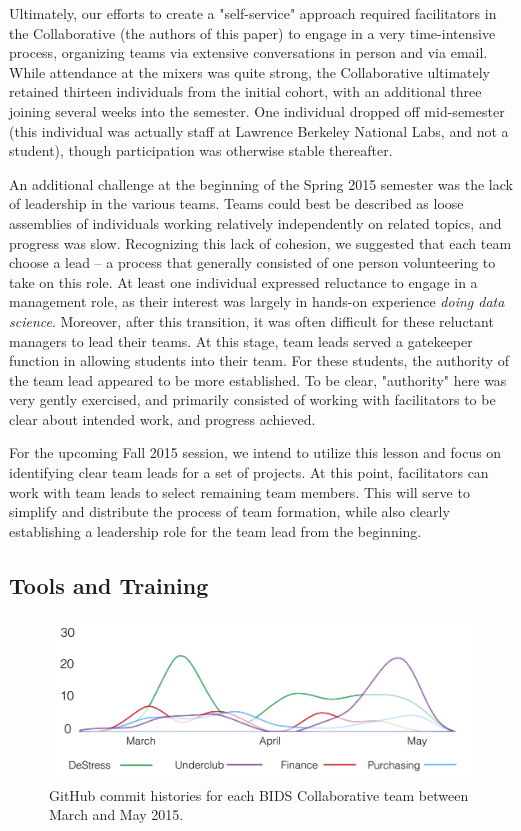 \documentclass{sig-alternate}
\begin{document}
Ultimately, our efforts to create a "self-service" approach required facilitators in the Collaborative (the authors of this paper) to engage in a very time-intensive process, organizing teams via extensive conversations in person and via email. While attendance at the mixers was quite strong, the Collaborative ultimately retained thirteen individuals from the initial cohort, with an additional three joining several weeks into the semester. One individual dropped off mid-semester (this individual was actually staff at Lawrence Berkeley National Labs, and not a student), though participation was otherwise stable thereafter.

An additional challenge at the beginning of the Spring 2015 semester was the lack of leadership in the various teams. Teams could best be described as loose assemblies of individuals working relatively independently on related topics, and progress was slow. Recognizing this lack of cohesion, we suggested that each team choose a lead -- a process that generally consisted of one person volunteering to take on this role. At least one individual expressed reluctance to engage in a management role, as their interest was largely in hands-on experience \emph{doing data science}. Moreover, after this transition, it was often difficult for these reluctant managers to lead their teams.  At this stage, team leads served a gatekeeper function in allowing students into their team. For these students, the authority of the team lead appeared to be more established. To be clear, "authority" here was very gently exercised, and primarily consisted of working with facilitators to be clear about intended work, and progress achieved. 

For the upcoming Fall 2015 session, we intend to utilize this lesson and focus on identifying clear team leads for a set of projects. At this point, facilitators can work with team leads to select remaining team members. This will serve to simplify and distribute the process of team formation, while also clearly establishing a leadership role for the team lead from the beginning.

\subsection{Tools and Training}

\begin{figure}
\centerline{\includegraphics[scale=0.27]{dsc_figure_gitcommits.png}}
\caption{GitHub commit histories for each BIDS Collaborative team between March and May 2015.}
\label{fig:gitcommits}
\end{figure}
\end{document}
